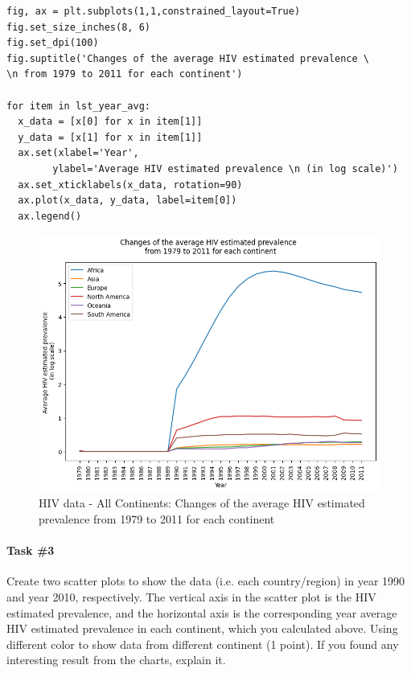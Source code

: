 \documentclass[UTF8, letter]{article}
\begin{document}
\pagebreak
\begin{codeblock}
\begin{verbatim}
fig, ax = plt.subplots(1,1,constrained_layout=True)
fig.set_size_inches(8, 6)
fig.set_dpi(100)
fig.suptitle('Changes of the average HIV estimated prevalence \
\n from 1979 to 2011 for each continent')

for item in lst_year_avg:
  x_data = [x[0] for x in item[1]]
  y_data = [x[1] for x in item[1]]
  ax.set(xlabel='Year', 
        ylabel='Average HIV estimated prevalence \n (in log scale)')
  ax.set_xticklabels(x_data, rotation=90)
  ax.plot(x_data, y_data, label=item[0])
  ax.legend()
\end{verbatim}
\end{codeblock}

\begin{figure}[h!]
	\centering
	\includegraphics[width=\linewidth]{output_18.png}
	\caption{HIV data - All Continents: Changes of the average HIV estimated prevalence from 1979 to 2011 for each continent}
	\label{fig:boat1}
\end{figure}

\pagebreak
\paragraph{Task \#3}
Create two scatter plots to show the data (i.e. each country/region) in year 1990 and year 2010, respectively. The vertical axis in the scatter plot is the HIV estimated prevalence, and the horizontal axis is the corresponding year average HIV estimated prevalence in each continent, which you calculated above. Using different color to show data from different continent (1 point). If you found any interesting result from the charts, explain it.
\end{document}
